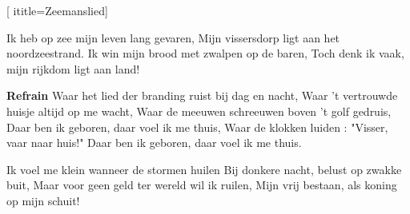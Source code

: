  [
ititle={Zeemanslied}]

\beginverse
Ik heb op zee mijn leven lang gevaren,
Mijn vissersdorp ligt aan het noordzeestrand.
Ik win mijn brood met zwalpen op de baren,
Toch denk ik vaak, mijn rijkdom ligt aan land!
\endverse

\beginchorus
\textbf{Refrain}
Waar het lied der branding ruist bij dag en nacht,
Waar 't vertrouwde huisje altijd op me wacht,
Waar de meeuwen schreeuwen boven 't golf gedruis,
Daar ben ik geboren, daar voel ik me thuis,
Waar de klokken luiden : "Visser, vaar naar huis!"
Daar ben ik geboren, daar voel ik me thuis.
\endchorus

\beginverse
Ik voel me klein wanneer de stormen huilen
Bij donkere nacht, belust op zwakke buit,
Maar voor geen geld ter wereld wil ik ruilen,
Mijn vrij bestaan, als koning op mijn schuit!
\endverse
\endsong